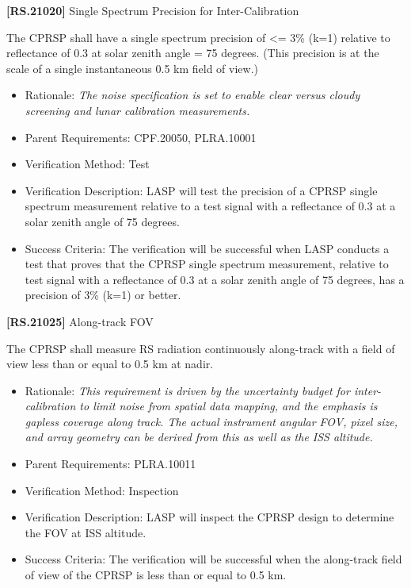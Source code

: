 \documentclass[12pt,oneside,oldfontcommands]{memoir}
\begin{document}
\textbf{[RS.21020]} Single Spectrum Precision for Inter-Calibration

The \gls{CPRSP} shall have a single spectrum precision of <= 3\% (k=1) relative to reflectance of 0.3 at solar zenith angle = 75 degrees. (This precision is at the scale of a single instantaneous 0.5 km field of view.)

\begin{itemize}
\item{} Rationale: \emph{The noise specification is set to enable clear versus cloudy screening and lunar calibration measurements.}

\item{} Parent Requirements: \gls{CPF}.20050, PLRA.10001

\item{} Verification Method: Test

\item{} Verification Description: \gls{LASP} will \gls{test} the precision of a \gls{CPRSP} single spectrum \gls{measure}ment relative to a \gls{test} signal with a reflectance of 0.3 at a solar zenith angle of 75 degrees.

\item{} Success Criteria: The verification will be successful when \gls{LASP} conducts a \gls{test} that proves that the \gls{CPRSP} single spectrum \gls{measure}ment, relative to \gls{test} signal with a reflectance of 0.3 at a solar zenith angle of 75 degrees, has a precision of 3\% (k=1) or better.

\end{itemize}

\textbf{[RS.21025]} Along-track \gls{FOV}

The \gls{CPRSP} shall \gls{measure} \gls{RS} radiation continuously along-track with a field of view less than or equal to 0.5 km at nadir.

\begin{itemize}
\item{} Rationale: \emph{This requirement is driven by the uncertainty budget for inter-calibration to limit noise from spatial data mapping, and the emphasis is gapless coverage along track. The actual instrument angular FOV, pixel size, and array geometry can be derived from this as well as the ISS altitude.}

\item{} Parent Requirements: PLRA.10011

\item{} Verification Method: Inspection

\item{} Verification Description: \gls{LASP} will inspect the \gls{CPRSP} design to determine the \gls{FOV} at \gls{ISS} altitude.

\item{} Success Criteria: The verification will be successful when the along-track field of view of the \gls{CPRSP} is less than or equal to 0.5 km.

\end{itemize}
\end{document}
